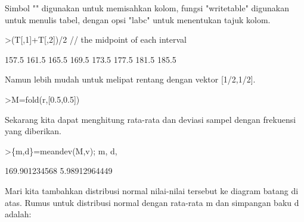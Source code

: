 \documentclass[a4paper,10pt]{article}
\begin{document}
\begin{eulernotebook}
\begin{eulercomment}
\begin{eulercomment}
\begin{eulercomment}
\begin{eulercomment}
\begin{eulercomment}
\begin{eulercomment}
\begin{eulercomment}
\begin{eulercomment}
\begin{eulercomment}
\begin{eulercomment}
\begin{eulercomment}
\begin{eulercomment}
\begin{eulercomment}
\begin{eulercomment}
\begin{eulercomment}
\begin{eulercomment}
\begin{eulercomment}
\begin{eulercomment}
\begin{eulercomment}
\begin{eulercomment}
\begin{eulercomment}
\begin{eulercomment}
\begin{eulercomment}
\begin{eulercomment}
\begin{eulercomment}
\begin{eulercomment}
\begin{eulercomment}
\begin{eulercomment}
\begin{eulercomment}
\begin{eulercomment}
\begin{eulercomment}
\begin{eulercomment}
\begin{eulercomment}
Simbol "\textbar{}" digunakan untuk memisahkan kolom, fungsi "writetable"
digunakan untuk menulis tabel, dengan opsi "labc" untuk menentukan
tajuk kolom.
\end{eulercomment}
\begin{eulerprompt}
>(T[,1]+T[,2])/2 // the midpoint of each interval
\end{eulerprompt}
\begin{euleroutput}
          157.5 
          161.5 
          165.5 
          169.5 
          173.5 
          177.5 
          181.5 
          185.5 
\end{euleroutput}
\begin{eulercomment}
Namun lebih mudah untuk melipat rentang dengan vektor [1/2,1/2].
\end{eulercomment}
\begin{eulerprompt}
>M=fold(r,[0.5,0.5])
\end{eulerprompt}
\begin{euleroutput}
  [157.5,  161.5,  165.5,  169.5,  173.5,  177.5,  181.5,  185.5]
\end{euleroutput}
\begin{eulercomment}
Sekarang kita dapat menghitung rata-rata dan deviasi sampel dengan
frekuensi yang diberikan.
\end{eulercomment}
\begin{eulerprompt}
>\{m,d\}=meandev(M,v); m, d,
\end{eulerprompt}
\begin{euleroutput}
  169.901234568
  5.98912964449
\end{euleroutput}
\begin{eulercomment}
Mari kita tambahkan distribusi normal nilai-nilai tersebut ke diagram
batang di atas. Rumus untuk distribusi normal dengan rata-rata m dan
simpangan baku d adalah:


\end{eulercomment}
\end{eulercomment}
\end{eulercomment}
\end{eulercomment}
\end{eulercomment}
\end{eulercomment}
\end{eulercomment}
\end{eulercomment}
\end{eulercomment}
\end{eulercomment}
\end{eulercomment}
\end{eulercomment}
\end{eulercomment}
\end{eulercomment}
\end{eulercomment}
\end{eulercomment}
\end{eulercomment}
\end{eulercomment}
\end{eulercomment}
\end{eulercomment}
\end{eulercomment}
\end{eulercomment}
\end{eulercomment}
\end{eulercomment}
\end{eulercomment}
\end{eulercomment}
\end{eulercomment}
\end{eulercomment}
\end{eulercomment}
\end{eulercomment}
\end{eulercomment}
\end{eulercomment}
\end{eulercomment}
\end{eulernotebook}
\end{document}
